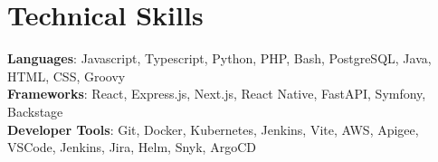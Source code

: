 \documentclass[letterpaper,11pt]{article}
\begin{document}
%
\section{Technical Skills}
 \begin{itemize}[leftmargin=0.15in, label={}]
    \small{\item{
     \textbf{Languages}{: Javascript, Typescript, Python, PHP, Bash, PostgreSQL, Java, HTML, CSS, Groovy} \\
     \textbf{Frameworks}{: React, Express.js, Next.js, React Native, FastAPI, Symfony, Backstage} \\
     \textbf{Developer Tools}{: Git, Docker, Kubernetes, Jenkins, Vite, AWS, Apigee, VSCode, Jenkins, Jira, Helm, Snyk, ArgoCD} \\
    }}
 \end{itemize}


\end{document}
